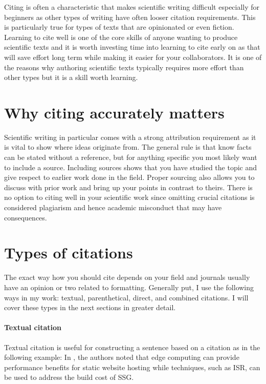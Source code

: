 Citing is often a characteristic that makes scientific writing difficult especially for beginners as other types of writing have often looser citation requirements.
This is particularly true for types of texts that are opinionated or even fiction.
Learning to cite well is one of the core skills of anyone wanting to produce scientific texts and it is worth investing time into learning to cite early on as that will save effort long term while making it easier for your collaborators.
It is one of the reasons why authoring scientific texts typically requires more effort than other types but it is a skill worth learning.

\section{Why citing accurately matters}

Scientific writing in particular comes with a strong attribution requirement as it is vital to show where ideas originate from.
The general rule is that know facts can be stated without a reference, but for anything specific you most likely want to include a source.
Including sources shows that you have studied the topic and give respect to earlier work done in the field.
Proper sourcing also allows you to discuss with prior work and bring up your points in contrast to theirs.
There is no option to citing well in your scientific work since omitting crucial citations is considered plagiarism and hence academic misconduct that may have consequences.

\section{Types of citations}

The exact way how you should cite depends on your field and journals usually have an opinion or two related to formatting.
Generally put, I use the following ways in my work: textual, parenthetical, direct, and combined citations.
I will cover these types in the next sections in greater detail.

\paragraph{Textual citation}

Textual citation is useful for constructing a sentence based on a citation as in the following example: In \citet{vepsalainen2023implications}, the authors noted that edge computing can provide performance benefits for static website hosting while techniques, such as ISR, can be used to address the build cost of SSG.

